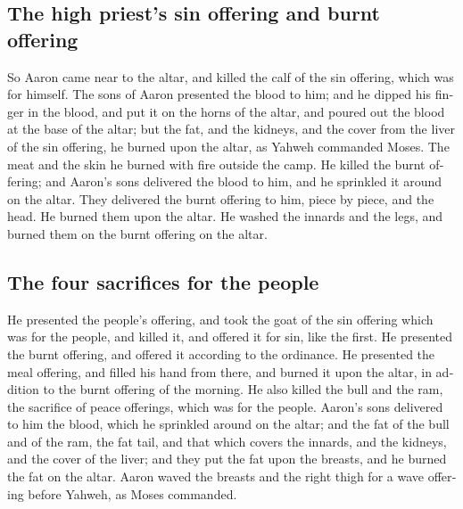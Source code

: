 \begin{paracol}{2}
\begin{otherlanguage}{english}
\hypertarget{the-high-priests-sin-offering-and-burnt-offering}{%
\subsection{The high priest's sin offering and burnt
offering}\label{the-high-priests-sin-offering-and-burnt-offering}}

 So Aaron came near to the altar, and killed the calf of
the sin offering, which was for himself.  The sons of
Aaron presented the blood to him; and he dipped his finger in the blood,
and put it on the horns of the altar, and poured out the blood at the
base of the altar;  but the fat, and the kidneys, and the
cover from the liver of the sin offering, he burned upon the altar, as
Yahweh commanded Moses.  The meat and the skin he burned
with fire outside the camp.  He killed the burnt
offering; and Aaron's sons delivered the blood to him, and he sprinkled
it around on the altar.  They delivered the burnt
offering to him, piece by piece, and the head. He burned them upon the
altar.  He washed the innards and the legs, and burned
them on the burnt offering on the altar.

\hypertarget{the-four-sacrifices-for-the-people}{%
\subsection{The four sacrifices for the
people}\label{the-four-sacrifices-for-the-people}}

 He presented the people's offering, and took the goat of
the sin offering which was for the people, and killed it, and offered it
for sin, like the first.  He presented the burnt
offering, and offered it according to the ordinance.  He
presented the meal offering, and filled his hand from there, and burned
it upon the altar, in addition to the burnt offering of the morning.
 He also killed the bull and the ram, the sacrifice of
peace offerings, which was for the people. Aaron's sons delivered to him
the blood, which he sprinkled around on the altar;  and
the fat of the bull and of the ram, the fat tail, and that which covers
the innards, and the kidneys, and the cover of the liver;
 and they put the fat upon the breasts, and he burned the
fat on the altar.  Aaron waved the breasts and the right
thigh for a wave offering before Yahweh, as Moses commanded.


\end{otherlanguage}
\end{paracol}
